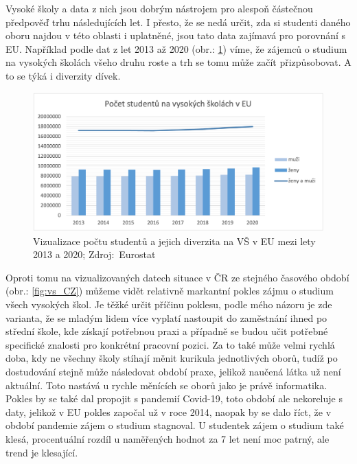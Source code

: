 \documentclass[12pt]{report}			%
\begin{document}
            Vysoké školy a data z nich jsou dobrým nástrojem pro alespoň částečnou předpověď trhu následujících let. I přesto, že se nedá určit, zda si studenti daného oboru najdou v této oblasti i uplatněné, jsou tato data zajímavá pro porovnání s EU. Například podle dat z let 2013 až 2020 (obr.: \ref{fig:vs_EU}) víme, že zájemců o studium na vysokých školách všeho druhu roste a trh se tomu může začít přizpůsobovat. A to se týká i diverzity dívek. \cite{StudentsTeritaryEducation}
            \begin{figure}[h]
                \centering 
                \includegraphics[width=16cm]{Maturitni Prace/images/vs_EU.png}
                \caption[Vizualizace diverzity na VŠ v EU 2013/20]{Vizualizace počtu studentů a jejich diverzita na VŠ v EU mezi lety 2013 a 2020; Zdroj:~Eurostat}
                \label{fig:vs_EU}
            \end{figure}

            Oproti tomu na vizualizovaných datech situace v ČR ze stejného časového období (obr.: \ref{fig:vs_CZ}) můžeme vidět relativně markantní pokles zájmu o studium všech vysokých škol. Je těžké určit příčinu poklesu, podle mého názoru je zde varianta, že se mladým lidem více vyplatí nastoupit do zaměstnání ihned po střední škole, kde získají potřebnou praxi a případně se budou učit potřebné specifické znalosti pro konkrétní pracovní pozici. Za to také může velmi rychlá doba, kdy ne všechny školy stíhají měnit kurikula jednotlivých oborů, tudíž po dostudování stejně může následovat období praxe, jelikož naučená látka už není aktuální. Toto nastává u rychle měnících se oborů jako je právě informatika. Pokles by se také dal propojit s pandemií Covid-19, toto období ale nekoreluje s daty, jelikož v EU pokles započal už v roce 2014, naopak by se dalo říct, že v období pandemie zájem o studium stagnoval. U studentek zájem o studium také klesá, procentuální rozdíl u naměřených hodnot za 7 let není moc patrný, ale trend je klesající.\cite{StudentsTeritaryEducation}
            
\end{document}
